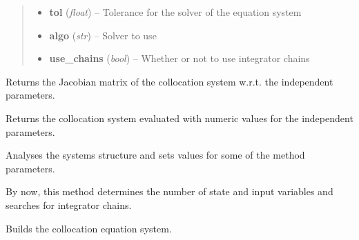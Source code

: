 \documentclass[letterpaper,10pt,english]{sphinxmanual}
\begin{document}
\begin{fulllineitems}
\begin{quote}
\begin{description}
\begin{itemize}
\item {} 
\textbf{tol} (\emph{float}) -- Tolerance for the solver of the equation system

\item {} 
\textbf{algo} (\emph{str}) -- Solver to use

\item {} 
\textbf{use\_chains} (\emph{bool}) -- Whether or not to use integrator chains

\end{itemize}

\end{description}\end{quote}

\begin{fulllineitems}
\label{pytrajectory:pytrajectory.trajectory.Trajectory.DG}
Returns the Jacobian matrix of the collocation system w.r.t. the independent parameters.

\end{fulllineitems}


\begin{fulllineitems}
\label{pytrajectory:pytrajectory.trajectory.Trajectory.G}
Returns the collocation system evaluated with numeric values for the independent parameters.

\end{fulllineitems}


\begin{fulllineitems}
\label{pytrajectory:pytrajectory.trajectory.Trajectory.analyseSystem}
Analyses the systems structure and sets values for some of the method parameters.

By now, this method determines the number of state and input variables and searches for
integrator chains.

\end{fulllineitems}


\begin{fulllineitems}
\label{pytrajectory:pytrajectory.trajectory.Trajectory.buildEQS}
Builds the collocation equation system.


\end{fulllineitems}
\end{fulllineitems}
\end{document}
